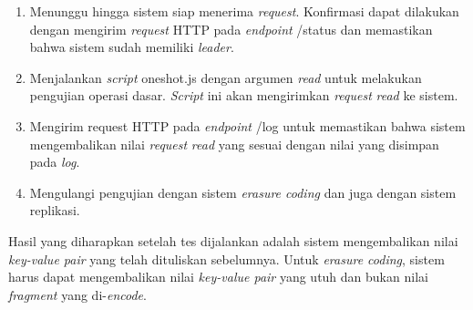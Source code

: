 \begin{enumerate}
  \item Menunggu hingga sistem siap menerima \textit{request}. Konfirmasi dapat dilakukan dengan mengirim \textit{request} HTTP pada \textit{endpoint} /status dan memastikan bahwa sistem sudah memiliki \textit{leader}.
  \item Menjalankan \textit{script} oneshot.js dengan argumen \textit{read} untuk melakukan pengujian operasi dasar. \textit{Script} ini akan mengirimkan \textit{request} \textit{read} ke sistem.
  \item Mengirim request HTTP pada \textit{endpoint} /log untuk memastikan bahwa sistem mengembalikan nilai \textit{request} \textit{read} yang sesuai dengan nilai yang disimpan pada \textit{log}.
  \item Mengulangi pengujian dengan sistem \textit{erasure coding} dan juga dengan sistem replikasi.
\end{enumerate}

Hasil yang diharapkan setelah tes dijalankan adalah sistem mengembalikan nilai \textit{key-value pair} yang telah dituliskan sebelumnya. Untuk \textit{erasure coding}, sistem harus dapat mengembalikan nilai \textit{key-value pair} yang utuh dan bukan nilai \textit{fragment} yang di-\textit{encode}.